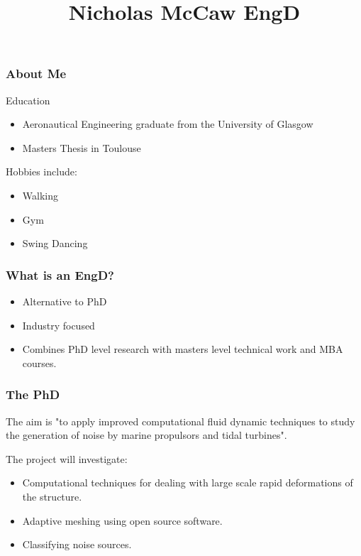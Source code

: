 \documentclass{beamer}
\begin{document}
	\title{Nicholas McCaw EngD}
	\frame{\titlepage}
	\begin{frame}
		\frametitle{About Me}
		Education
		\begin{itemize}	
		\item Aeronautical Engineering graduate from the University of Glasgow
		\item Masters Thesis in Toulouse
		\end{itemize}
		Hobbies include:
		\begin{itemize}
			\item Walking
			\item Gym
			\item Swing Dancing
		\end{itemize}
	\end{frame}
	\begin{frame}
		\frametitle{What is an EngD?}
		\begin{itemize}
			\item Alternative to PhD
			\item Industry focused 
			\item Combines PhD level research with masters level technical work and MBA courses.
		\end{itemize}
	\end{frame}

	\begin{frame}
		\frametitle{The PhD}
		The aim is "to apply improved computational fluid dynamic techniques to study the generation of noise by marine propulsors and tidal turbines".
		
		The project will investigate:
		\begin{itemize}
			\item Computational techniques for dealing with large scale rapid deformations of the structure.
			\item Adaptive meshing using open source software.
			\item Classifying noise sources.
		\end{itemize}
	\end{frame}
\end{document}
